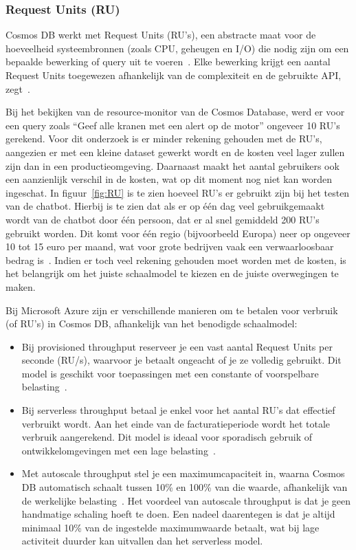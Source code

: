 \subsubsection{Request Units (RU)}
Cosmos DB werkt met Request Units (RU's), een abstracte maat voor de hoeveelheid systeembronnen (zoals CPU, geheugen en I/O) die nodig zijn om een bepaalde bewerking of query uit te voeren~\autocite{Brown2024}.
Elke bewerking krijgt een aantal Request Units toegewezen afhankelijk van de complexiteit en de gebruikte API, zegt~\textcite{Brown2024}.

Bij het bekijken van de resource-monitor van de Cosmos Database, werd er voor een query zoals ``Geef alle kranen met een alert op de motor'' ongeveer 10 RU's gerekend.
Voor dit onderzoek is er minder rekening gehouden met de RU's, aangezien er met een kleine dataset gewerkt wordt en de kosten veel lager zullen zijn dan in een productieomgeving.
Daarnaast maakt het aantal gebruikers ook een aanzienlijk verschil in de kosten, wat op dit moment nog niet kan worden ingeschat.
In figuur~\ref{fig:RU} is te zien  hoeveel RU's er gebruikt zijn bij het testen van de chatbot.
Hierbij is te zien dat als er op één dag veel gebruikgemaakt wordt van de chatbot door één persoon, dat er al snel gemiddeld 200 RU's gebruikt worden.
Dit komt voor één regio (bijvoorbeeld Europa) neer op ongeveer 10 tot 15 euro per maand, wat voor grote bedrijven vaak een verwaarloosbaar bedrag is~\autocite{azurePrices25}.
Indien er toch veel rekening gehouden moet worden met de kosten, is het belangrijk om het juiste schaalmodel te kiezen en de juiste overwegingen te maken.

Bij Microsoft Azure zijn er verschillende manieren om te betalen voor verbruik (of RU's) in Cosmos DB, afhankelijk van het benodigde schaalmodel:
\begin{itemize}
     \item Bij provisioned throughput reserveer je een vast aantal Request Units per seconde (RU/s), waarvoor je betaalt ongeacht of je ze volledig gebruikt. Dit model is geschikt voor toepassingen met een constante of voorspelbare belasting~\autocite{provisioned2024}.
     \item Bij serverless throughput betaal je enkel voor het aantal RU's dat effectief verbruikt wordt. Aan het einde van de facturatieperiode wordt het totale verbruik aangerekend. Dit model is ideaal voor sporadisch gebruik of ontwikkelomgevingen met een lage belasting~\autocite{serverless2025}.
     \item Met autoscale throughput stel je een maximumcapaciteit in, waarna Cosmos DB automatisch schaalt tussen 10\% en 100\% van die waarde, afhankelijk van de werkelijke belasting~\autocite{autoscale2024}. Het voordeel van autoscale throughput is dat je geen handmatige schaling hoeft te doen. Een nadeel daarentegen is dat je altijd minimaal 10\% van de ingestelde maximumwaarde betaalt, wat bij lage activiteit duurder kan uitvallen dan het serverless model.
 \end{itemize}

